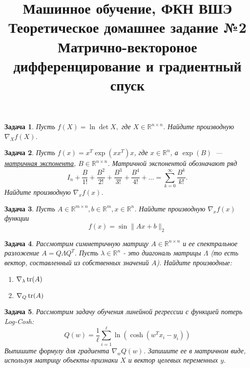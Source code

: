 \documentclass[12pt,fleqn]{article}
\title{Машинное обучение, ФКН ВШЭ\\Теоретическое домашнее задание №2\\Матрично-вектороное дифференцирование и градиентный спуск}
\author{}
\date{}
\newtheorem{esProblem}{Задача}
\begin{document}
\maketitle

\begin{esProblem}
    Пусть $f(X) = \ln \det X,$ где $X \in \mathbb{R}^{n\times n}$. Найдите производную $\nabla_X f(X)$.
\end{esProblem}

\begin{esProblem}
    Пусть $f(x) = x^T \exp(xx^T)x$, где $x \in \mathbb{R}^{n}$, а $\exp(B)$~--- \href{https://en.wikipedia.org/wiki/Matrix_exponential}{матричная экспонента},
    $B \in \mathbb{R}^{n \times n}$.
    Матричной экспонентой обозначают ряд
    \begin{equation*}
        I_n + \frac{B}{1!} + \frac{B^2}{2!} + \frac{B^3}{3!} + \frac{B^4}{4!} + \ldots = \sum_{k=0}^\infty \frac{B^k}{k!} .
    \end{equation*}
    Найдите производную $\nabla_x f(x)$.
\end{esProblem}

\begin{esProblem}
    Пусть $A \in \mathbb{R}^{m \times n}, b \in \mathbb{R}^m, x \in \mathbb{R}^n$. Найдите производную $\nabla_x f(x)$ функции
    \[
    f(x) = \sin \|Ax + b\|_2
    \]
\end{esProblem}

\begin{esProblem}
    Рассмотрим симметричную матрицу $A \in \mathbb{R}^{n \times n}$ и ее спектральное разложение $A = Q \Lambda Q^T$.
    Пусть $\lambda \in \mathbb{R}^n$ - это диагональ матрицы $\Lambda$ (то есть вектор, составленный из собственных значений $A$).
    Найдите производные:
    
    \begin{enumerate}
        \item $\displaystyle \nabla_\lambda \mathop{\mathrm{tr}}(A)$
        \item $\displaystyle \nabla_Q \mathop{\mathrm{tr}}(A)$
    \end{enumerate}
\end{esProblem}

\begin{esProblem}
    Рассмотрим задачу обучения линейной регрессии с функцией потерь Log-Cosh:
    \[
    Q(w) = \frac{1}{\ell} \sum_{i=1}^{\ell} \ln (\cosh (w^T x_i - y_i))
    \]
    Выпишите формулу для градиента $\nabla_w Q(w)$. Запишите ее в матричном виде, используя матрицу объекты-признаки $X$ и вектор целевых переменных $y$.
\end{esProblem}
\end{document}
